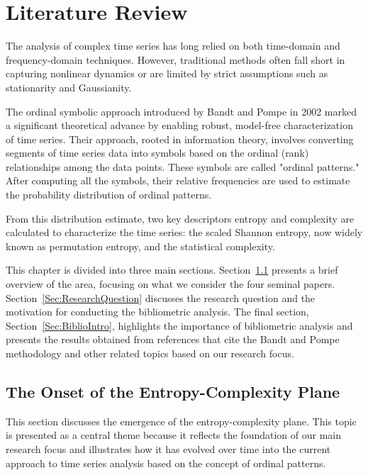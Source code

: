 \chapter{Literature Review}\label{C:lit}

The analysis of complex time series has long relied on both time-domain and frequency-domain techniques. 
However, traditional methods often fall short in capturing nonlinear dynamics or are limited by strict assumptions such as stationarity and Gaussianity. 

The ordinal symbolic approach introduced by Bandt and Pompe in 2002 marked a significant theoretical advance by enabling robust, model-free characterization of time series. 
Their approach, rooted in information theory, involves converting segments of time series data into symbols based on the ordinal (rank) relationships among the data points.
These symbols are called "ordinal patterns." After computing all the symbols, their relative frequencies are used to estimate the probability distribution of ordinal patterns.

From this distribution estimate, two key descriptors entropy and complexity are calculated to characterize the time series: the scaled Shannon entropy, now widely known as permutation entropy, and the statistical complexity.

This chapter is divided into three main sections. Section~\ref{Sec:Onset} presents a brief overview of the area, focusing on what we consider the four seminal papers. Section~\ref{Sec:ResearchQuestion} discusses the research question and the motivation for conducting the bibliometric analysis. The final section, Section~\ref{Sec:BiblioIntro}, highlights the importance of bibliometric analysis and presents the results obtained from references that cite the Bandt and Pompe methodology and other related topics based on our research focus.  


\section{The Onset of the Entropy-Complexity Plane}\label{Sec:Onset}

This section discusses the emergence of the entropy-complexity plane. This topic is presented as a central theme because it reflects the foundation of our main research focus and illustrates how it has evolved over time into the current approach to time series analysis based on the concept of ordinal patterns. 

